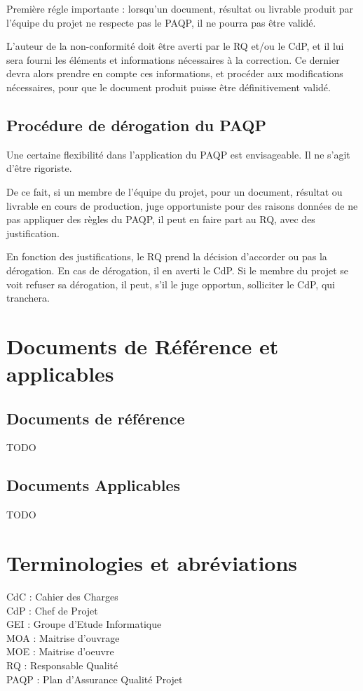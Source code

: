 Première régle importante : lorsqu'un document, résultat ou livrable produit par l'équipe du projet ne respecte pas le PAQP, il ne pourra pas être validé.

L'auteur de la non-conformité doit être averti par le RQ et/ou le CdP, et il lui sera fourni les éléments et informations nécessaires à la correction. Ce dernier devra alors prendre en compte ces informations, et procéder aux modifications nécessaires, pour que le document produit puisse être définitivement validé.

  \subsection{Procédure de dérogation du PAQP}
Une certaine flexibilité dans l'application du PAQP est envisageable. Il ne s'agit d'être rigoriste.

De ce fait, si un membre de l'équipe du projet, pour un document, résultat ou livrable en cours de production, juge opportuniste pour des raisons données de ne pas appliquer des règles du PAQP, il peut en faire part au RQ, avec des justification.

En fonction des justifications, le RQ prend la décision d'accorder ou pas la dérogation. En cas de dérogation, il en averti le CdP. Si le membre du projet se voit refuser sa dérogation, il peut, s'il le juge opportun, solliciter le CdP, qui tranchera.
\section{Documents de Référence et applicables}
  \subsection{Documents de référence}
  \begin{center} \begin{Large}TODO\end{Large}  \end{center}
  \subsection{Documents Applicables}
  \begin{center} \begin{Large}TODO\end{Large}  \end{center}

\section{Terminologies et abréviations}
\noindent CdC : Cahier des Charges \\
CdP : Chef de Projet\\       
GEI : Groupe d'Etude Informatique\\ 
MOA : Maitrise d'ouvrage\\      
MOE : Maitrise d'oeuvre\\
RQ : Responsable Qualité\\    
PAQP : Plan d’Assurance Qualité Projet
                                                                     
